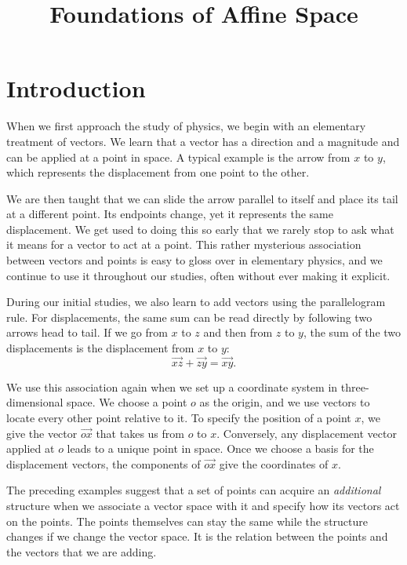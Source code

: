 \documentclass[12pt]{article}
\title{Foundations of Affine Space}
\author{}
\date{}
\begin{document}
\maketitle

\section{Introduction}

When we first approach the study of physics, we begin with an elementary
treatment of vectors. We learn that a vector has a direction and a magnitude
and can be applied at a point in space. A typical example is the arrow from
$x$ to $y$, which represents the displacement from one point to the other.

We are then taught that we can slide the arrow parallel to itself and place
its tail at a different point. Its endpoints change, yet it represents the
same displacement. We get used to doing this so early that we rarely stop
to ask what it means for a vector to act at a point. This rather mysterious
association between vectors and points is easy to gloss over in elementary
physics, and we continue to use it throughout our studies, often without
ever making it explicit. \par

During our initial studies, we also learn to add vectors using the
parallelogram rule. For displacements, the same sum can be read directly
by following two arrows head to tail. If we go from $x$ to $z$ and then from
$z$ to $y$, the sum of the two displacements is the displacement from $x$
to $y$:
\[
  \overrightarrow{xz} + \overrightarrow{zy} = \overrightarrow{xy}.
\]

We use this association again when we set up a coordinate system in
three-dimensional space. We choose a point $o$ as the origin, and we use
vectors to locate every other point relative to it. To specify the
position of a point $x$, we give the vector $\overrightarrow{ox}$ that
takes us from $o$ to $x$. Conversely, any displacement vector applied at
$o$ leads to a unique point in space. Once we choose a basis for the
displacement vectors, the components of $\overrightarrow{ox}$ give the
coordinates of $x$.

The preceding examples suggest that a set of points can acquire an
\emph{additional} structure when we associate a vector space with it
and specify how its vectors act on the points. The points themselves
can stay the same while the structure changes if we change the vector space. It is the relation
between the points and the vectors that we are adding.
\end{document}
